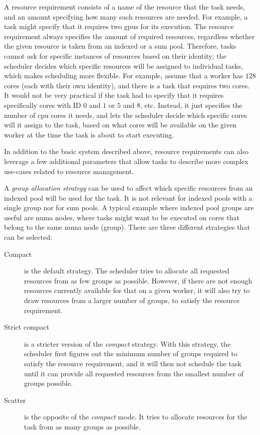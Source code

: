 A resource requirement consists of a name of the resource that the task needs, and an amount
specifying how many such resources are needed. For example, a task might specify that it requires
two \glspl{gpu} for its execution. The resource requirement always specifies the amount
of required resources, regardless whether the given resource is taken from an indexed or a sum
pool. Therefore, tasks cannot ask for specific instances of resources based on their identity; the
scheduler decides which specific resources will be assigned to individual tasks, which makes
scheduling more flexible. For example, assume that a worker has $128$ cores (each
with their own identity), and there is a task that requires two cores. It would not be very
practical if the task had to specify that it requires specifically cores with ID
$0$ and $1$ or $5$ and
$8$, etc. Instead, it just specifies the number of \gls{cpu} cores
it needs, and lets the scheduler decide which specific cores will it assign to the task, based on
what cores will be available on the given worker at the time the task is about to start executing.

In addition to the basic system described above, resource requirements can also leverage a few
additional parameters that allow tasks to describe more complex use-cases related to resource
management.

A \emph{group allocation strategy} can be used to affect which specific resources from an indexed pool will
be used for the task. It is not relevant for indexed pools with a single group nor for sum pools. A
typical example where indexed pool groups are useful are \gls{numa} nodes, where tasks
might want to be executed on cores that belong to the same \gls{numa} node (group). There are three
different strategies that can be selected:
\begin{description}
	\item [Compact] is the default strategy. The scheduler tries to allocate all requested
	      resources from as few groups as possible. However, if there are not enough resources currently
	      available for that on a given worker, it will also try to draw resources from a larger number of
	      groups, to satisfy the resource requirement.
	\item [Strict compact] is a stricter version of the \emph{compact} strategy. With this
	      strategy, the scheduler first figures out the minimum number of groups required to satisfy the
	      resource requirement, and it will then not schedule the task until it can provide all requested
	      resources from the smallest number of groups possible.
	\item [Scatter] is the opposite of the \emph{compact} mode. It tries to allocate resources
	      for the task from as many groups as possible.
\end{description}

